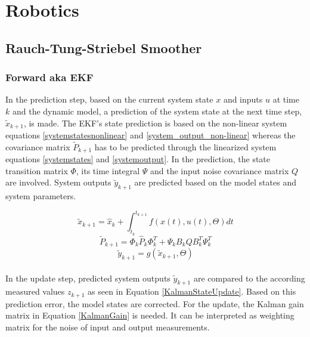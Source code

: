 
\chapter{Robotics}

\section{Rauch-Tung-Striebel Smoother}
\subsection{Forward aka EKF}
In the prediction step, based on the current system state $x$ and inputs $u$ at time $k$ and the dynamic model, a prediction of the system state at the next time step, $\widetilde{x}_{k+1}$, is made. The EKF's state prediction is based on the non-linear system equations  \ref{systemstatesnonlinear} and \ref{system_output_non-linear} whereas the covariance matrix $\widetilde{P} _{k+1}$ has to be predicted through the linearized system equations  \ref{systemstates} and \ref{systemoutput}. In the prediction, the state transition matrix $\Phi$, its time integral $\Psi$ and the input noise covariance matrix $Q$ are involved. System outputs $\widetilde{y}_{k+1}$ are predicted based on the model states and system parameters.

\begin{equation}
\widetilde{x} _{k+1} = \widehat{x} _{k} + \int_{t_{k}}^{t_{k+1}} f(x(t), u(t), \Theta)dt \label{KalmanStatePrediction}
\end{equation}
\begin{equation}
\widetilde{P} _{k+1} = \Phi_{k} \widehat{P}_k\Phi_{k}^T + \Psi_{k}B_{k}QB_{k}^T\Psi_{k}^T
\label{CovariancePrediction}
\end{equation}
\begin{equation}
\widetilde{y}_{k+1}= g(\widetilde{x} _{k+1},\Theta) \label{SystemOutputsKalman}
\end{equation}\\
In the update step, predicted system outputs $\widetilde{y}_{k+1}$ are compared to the according measured values $z_{k+1}$ as seen in Equation \ref{KalmanStateUpdate}. Based on this prediction error, the model states are corrected. For the update, the Kalman gain matrix in Equation \ref{KalmanGain} is needed. It can be interpreted as weighting matrix for the noise of input and output measurements.

